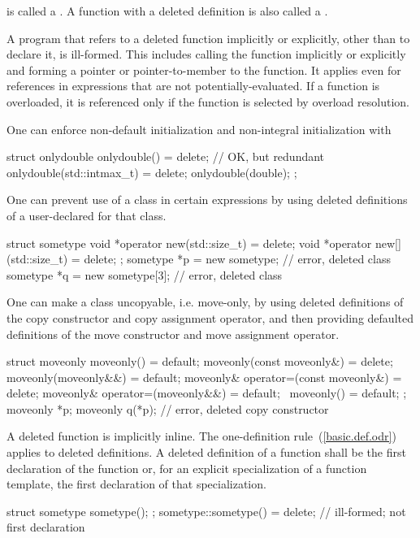 is called a . A function with a
deleted definition is also called a .

\pnum
A program that refers to a deleted function implicitly or explicitly, other
than to declare it, is ill-formed. \enternote This includes calling the function
implicitly or explicitly and forming a pointer or pointer-to-member to the
function. It applies even for references in expressions that are not
potentially-evaluated. If a function is overloaded, it is referenced only if the
function is selected by overload resolution. \exitnote

\pnum
\enterexample One can enforce non-default initialization and non-integral
initialization with

\begin{codeblock}
struct onlydouble {
  onlydouble() = delete;              // OK, but redundant
  onlydouble(std::intmax_t) = delete;
  onlydouble(double);
};
\end{codeblock}

\exitexample

\enterexample One can prevent use of a
class in certain  expressions by using deleted definitions
of a user-declared  for that class.

\begin{codeblock}
struct sometype {
  void *operator new(std::size_t) = delete;
  void *operator new[](std::size_t) = delete;
};
sometype *p = new sometype;     // error, deleted class 
sometype *q = new sometype[3];  // error, deleted class 
\end{codeblock}
\exitexample

\enterexample One can make a class uncopyable, i.e. move-only, by using deleted
definitions of the copy constructor and copy assignment operator, and then
providing defaulted definitions of the move constructor and move assignment operator.

\begin{codeblock}
struct moveonly {
  moveonly() = default;
  moveonly(const moveonly&) = delete;
  moveonly(moveonly&&) = default;
  moveonly& operator=(const moveonly&) = delete;
  moveonly& operator=(moveonly&&) = default;
  ~moveonly() = default;
};
moveonly *p;
moveonly q(*p); // error, deleted copy constructor
\end{codeblock}
\exitexample

\pnum
A deleted function is implicitly inline. \enternote The
one-definition rule~(\ref{basic.def.odr}) applies to deleted definitions. \exitnote
A deleted definition of a function shall be the first declaration of the function or,
for an explicit specialization of a function template, the first declaration of that
specialization.
\enterexample
\begin{codeblock}
struct sometype {
  sometype();
};
sometype::sometype() = delete;      // ill-formed; not first declaration
\end{codeblock}
\exitexample%

